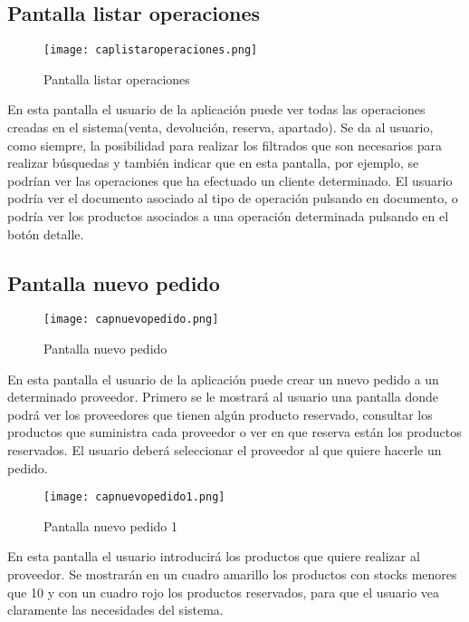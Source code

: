\newpage
\subsection {Pantalla listar operaciones}

\begin{figure}[!htb]
  \centering
    \texttt{[image: caplistaroperaciones.png]}
  \caption{Pantalla listar operaciones}
  \label{a}
\end{figure}

En esta pantalla el usuario de la aplicación puede ver todas las operaciones creadas en el sistema(venta, devolución, reserva, apartado). Se da al usuario, como siempre, la posibilidad para realizar los filtrados que son necesarios para realizar búsquedas y también indicar que en esta pantalla, por ejemplo, se podrían ver las operaciones que ha efectuado un cliente determinado. El usuario podría ver el documento asociado al tipo de operación pulsando en documento, o podría ver los productos asociados a una operación determinada pulsando en el botón detalle.

\newpage
\subsection {Pantalla nuevo pedido}

\begin{figure}[!htb]
  \centering
    \texttt{[image: capnuevopedido.png]}
  \caption{Pantalla nuevo pedido}
  \label{a}
\end{figure}

En esta pantalla el usuario de la aplicación puede crear un nuevo pedido a un determinado proveedor. Primero se le mostrará al usuario una pantalla donde podrá ver los proveedores que tienen algún producto reservado, consultar los productos que suministra cada proveedor o ver en que reserva están los productos reservados. El usuario deberá seleccionar el proveedor al que quiere hacerle un pedido. 

\newpage
\begin{figure}[!htb]
  \centering
    \texttt{[image: capnuevopedido1.png]}
  \caption{Pantalla nuevo pedido 1}
  \label{a}
\end{figure}

En esta pantalla el usuario introducirá los productos que quiere realizar al proveedor. Se mostrarán en un cuadro amarillo los productos con stocks menores que 10 y con un cuadro rojo los productos reservados, para que el usuario vea claramente las necesidades del sistema.

